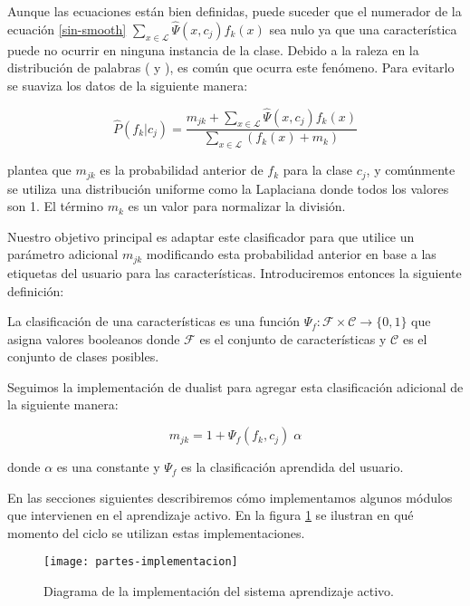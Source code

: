 Aunque las ecuaciones están bien definidas, puede suceder que el numerador de la ecuación \ref{sin-smooth} $\sum_{x \in \mathcal{L}} \hat{\Psi}(x, c_j) f_k(x)$ sea nulo ya que una característica puede no ocurrir en ninguna instancia de la clase. Debido a la raleza en la distribución de palabras (\citet{zipf1} y \citet{zipf2}), es común que ocurra este fenómeno. Para evitarlo se suaviza los datos de la siguiente manera:

\begin{equation}
\hat{P}(f_k|c_j) = \frac{m_{jk} + \sum_{x \in \mathcal{L}} \hat{\Psi}(x, c_j) f_k(x)}{\sum_{x \in \mathcal{L}} (f_k(x) + m_k)}
\end{equation}

\citet{dualist} plantea que $m_{jk}$ es la probabilidad anterior de $f_k$ para la clase $c_j$, y comúnmente se utiliza una distribución uniforme como la Laplaciana donde todos los valores son 1. El término $m_k$ es un valor para normalizar la división.

Nuestro objetivo principal es adaptar este clasificador para que utilice un parámetro adicional $m_{jk}$ modificando esta probabilidad anterior en base a las etiquetas del usuario para las características. Introduciremos entonces la siguiente definición:

\begin{definition}
La clasificación de una características es una función $\Psi_f:\mathcal{F} \times \mathcal{C} \rightarrow \{0, 1\}$ que asigna valores booleanos donde $\mathcal{F}$ es el conjunto de características y $\mathcal{C}$ es el conjunto de clases posibles.
\end{definition}

Seguimos la implementación de dualist para agregar esta clasificación adicional de la siguiente manera:

\begin{equation}\label{eq-feat-boost}
m_{jk} = 1 + \Psi_f(f_k, c_j) \; \alpha
\end{equation}

donde $\alpha$ es una constante y $\Psi_f$ es la clasificación aprendida del usuario.

\vspace{5 mm}
En las secciones siguientes describiremos cómo implementamos algunos módulos que intervienen en el aprendizaje activo. En la figura \ref{aa-con-secciones} se ilustran en qué momento del ciclo se utilizan estas implementaciones.

\begin{figure}[h!]\label{aa-con-secciones}
\centering
\texttt{[image: partes-implementacion]}
\caption{Diagrama de la implementación del sistema aprendizaje activo.}\label{aa-con-secciones}
\end{figure}

